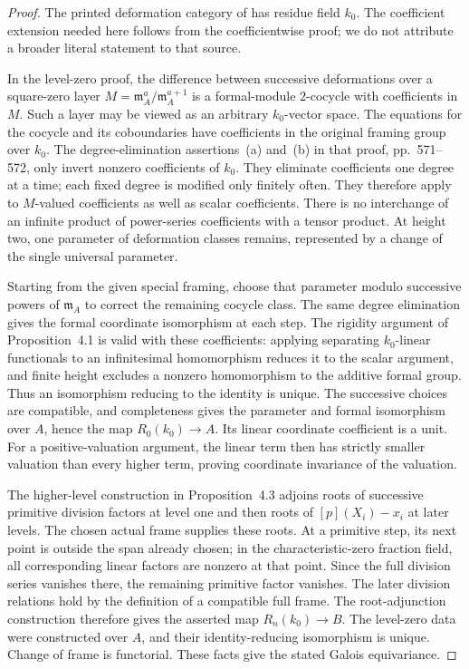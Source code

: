 \begin{proof}
The printed deformation category of
\citet[Propositions~4.1--4.3, pp.~570--573]{Drinfeld1974} has residue
field $k_0$. The coefficient extension needed here follows from
the coefficientwise proof; we do not attribute a broader literal
statement to that source.

In the level-zero proof, the difference between successive
deformations over a square-zero layer
$M=\mathfrak m_A^a/\mathfrak m_A^{a+1}$ is a formal-module
$2$-cocycle with coefficients in $M$. Such a layer may be viewed
as an arbitrary $k_0$-vector space. The equations for the cocycle
and its coboundaries have coefficients in the original framing
group over $k_0$. The degree-elimination assertions~(a) and~(b)
in that proof, pp.~571--572, only invert nonzero coefficients of
$k_0$. They eliminate coefficients one degree at a time; each
fixed degree is modified only finitely often. They therefore
apply to $M$-valued coefficients as well as scalar coefficients.
There is no interchange of an infinite product of power-series
coefficients with a tensor product. At height two, one parameter of deformation classes remains,
represented by a change of the single universal parameter.

Starting from the given special framing, choose that parameter
modulo successive powers of $\mathfrak m_A$ to correct the
remaining cocycle class. The same degree elimination gives the
formal coordinate isomorphism at each step. The rigidity argument
of Proposition~4.1 is valid with these coefficients: applying
separating $k_0$-linear functionals to an infinitesimal
homomorphism reduces it to the scalar argument, and finite height
excludes a nonzero homomorphism to the additive formal group.
Thus an isomorphism reducing to the identity is unique. The
successive choices are compatible, and completeness gives the
parameter and formal isomorphism over $A$, hence the map
$R_0(k_0)\to A$. Its linear coordinate coefficient is a unit.
For a positive-valuation argument, the linear term then has
strictly smaller valuation than every higher term, proving
coordinate invariance of the valuation.

The higher-level construction in Proposition~4.3 adjoins roots of
successive primitive division factors at level one and then roots
of $[p](X_i)-x_i$ at later levels. The chosen actual frame supplies
these roots. At a primitive step, its next point is outside the
span already chosen; in the characteristic-zero fraction field,
all corresponding linear factors are nonzero at that point.
Since the full division series vanishes there, the remaining
primitive factor vanishes. The later division relations hold by
the definition of a compatible full frame. The root-adjunction
construction therefore gives the asserted map $R_n(k_0)\to B$.
The level-zero data were constructed over $A$, and their
identity-reducing isomorphism is unique. Change of frame is
functorial. These facts give the stated Galois equivariance.
\end{proof}

